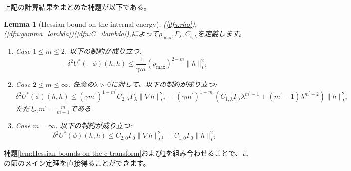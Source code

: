 \documentclass{jsarticle}
\newtheorem{lem}{Lemma}[section]
\theoremstyle{definition}
\begin{document}
上記の計算結果をまとめた補題が以下である。

\begin{lem}[Hessian bound on the internal energy]
    \label{lem:Hessian bound on the internal energy}
    (\ref{dfn:rho}),(\ref{dfn:gamma_lambda})(\ref{dfn:C_ilambda}),によって$\rho_{\max},\Gamma_\lambda, C_{i,\lambda}$を定義します。

    \begin{enumerate}
        \item Case $1 \leq m \leq 2$. 以下の制約が成り立つ:
            \[
                - \delta^2 U^*(- \phi)(h, h) \leq \frac{1}{\gamma m}(\rho_{\max})^{2-m} \|h\|_{L^2}^2 
            \]
        \item Case $2 \leq m \leq \infty$. 任意の$\lambda > 0$に対して、以下の制約が成り立つ:
            \[
                \delta^2 U^*(\phi)(h, h) \leq (\gamma m^\prime)^{1 - m^\prime} C_{2,\lambda} \Gamma_\lambda \| \nabla h \|_{L^2}^2 + (\gamma m^\prime)^{1 - m^\prime} \left(C_{1,\lambda} \Gamma_\lambda \lambda^{m^\prime - 1} + (m^\prime - 1) \lambda^{m^\prime - 2}\right) \|h\|_{L^2}^2
            \]
            ただし,\(m^\prime = \frac{m}{m - 1}\)である.
        \item Case $m = \infty$. 以下の制約が成り立つ:
            \[
                \delta^2 U^*(\phi)(h,h) \leq C_{2,0} \Gamma_0 \| \nabla h \|_{L^2}^2 + C_{1,0} \Gamma_0 \|h\|_{L^2}^2
            \]
    \end{enumerate}
\end{lem}

補題\ref{lem:Hessian bounds on the c-transform}および\ref{lem:Hessian bound on the internal energy}を組み合わせることで、この節のメイン定理を直接得ることができます。
\end{document}
